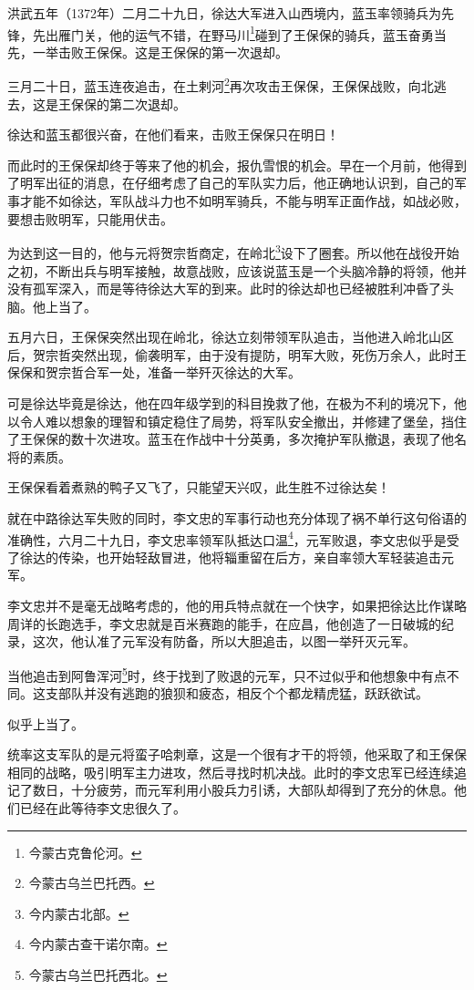 \begin{multicols}{\theparacolNo}
		洪武五年（1372年）二月二十九日，徐达大军进入山西境内，蓝玉率领骑兵为先锋，先出雁门关，他的运气不错，在野马川\footnote{今蒙古克鲁伦河。}碰到了王保保的骑兵，蓝玉奋勇当先，一举击败王保保。这是王保保的第一次退却。

		三月二十日，蓝玉连夜追击，在土剌河\footnote{今蒙古乌兰巴托西。}再次攻击王保保，王保保战败，向北逃去，这是王保保的第二次退却。

		徐达和蓝玉都很兴奋，在他们看来，击败王保保只在明日！

		而此时的王保保却终于等来了他的机会，报仇雪恨的机会。早在一个月前，他得到了明军出征的消息，在仔细考虑了自己的军队实力后，他正确地认识到，自己的军事才能不如徐达，军队战斗力也不如明军骑兵，不能与明军正面作战，如战必败，要想击败明军，只能用伏击。

		为达到这一目的，他与元将贺宗哲商定，在岭北\footnote{今内蒙古北部。}设下了圈套。所以他在战役开始之初，不断出兵与明军接触，故意战败，应该说蓝玉是一个头脑冷静的将领，他并没有孤军深入，而是等待徐达大军的到来。此时的徐达却也已经被胜利冲昏了头脑。他上当了。

		五月六日，王保保突然出现在岭北，徐达立刻带领军队追击，当他进入岭北山区后，贺宗哲突然出现，偷袭明军，由于没有提防，明军大败，死伤万余人，此时王保保和贺宗哲合军一处，准备一举歼灭徐达的大军。

		可是徐达毕竟是徐达，他在四年级学到的科目挽救了他，在极为不利的境况下，他以令人难以想象的理智和镇定稳住了局势，将军队安全撤出，并修建了堡垒，挡住了王保保的数十次进攻。蓝玉在作战中十分英勇，多次掩护军队撤退，表现了他名将的素质。

		王保保看着煮熟的鸭子又飞了，只能望天兴叹，此生胜不过徐达矣！

		就在中路徐达军失败的同时，李文忠的军事行动也充分体现了祸不单行这句俗语的准确性，六月二十九日，李文忠率领军队抵达口温\footnote{今内蒙古查干诺尔南。}，元军败退，李文忠似乎是受了徐达的传染，也开始轻敌冒进，他将辎重留在后方，亲自率领大军轻装追击元军。

		李文忠并不是毫无战略考虑的，他的用兵特点就在一个快字，如果把徐达比作谋略周详的长跑选手，李文忠就是百米赛跑的能手，在应昌，他创造了一日破城的纪录，这次，他认准了元军没有防备，所以大胆追击，以图一举歼灭元军。

		当他追击到阿鲁浑河\footnote{今蒙古乌兰巴托西北。}时，终于找到了败退的元军，只不过似乎和他想象中有点不同。这支部队并没有逃跑的狼狈和疲态，相反个个都龙精虎猛，跃跃欲试。

		似乎上当了。

		统率这支军队的是元将蛮子哈刺章，这是一个很有才干的将领，他采取了和王保保相同的战略，吸引明军主力进攻，然后寻找时机决战。此时的李文忠军已经连续追记了数日，十分疲劳，而元军利用小股兵力引诱，大部队却得到了充分的休息。他们已经在此等待李文忠很久了。


\end{multicols}
